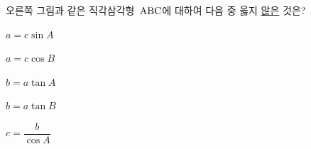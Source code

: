 \noindent\begin{minipage}[t]{0.58\linewidth}\vspace{0pt}\raggedright 오른쪽 그림과 같은 직각삼각형~$\mathrm{ABC}$에 대하여 다음 중 옳지 \underline{않은} 것은?\end{minipage}\hfill\begin{minipage}[t]{0.4\linewidth}\vspace{0pt}\centering \resizebox{\ifdim\width>\linewidth\linewidth\else\width\fi}{!}{}\end{minipage}\par
\begin{choicesii}{\rule[-3ex]{0pt}{8ex}$a=c\sin A$}{\rule[-3ex]{0pt}{8ex}$a=c\cos B$}{\rule[-3ex]{0pt}{8ex}$b=a\tan A$}{\rule[-3ex]{0pt}{8ex}$b=a\tan B$}{\rule[-3ex]{0pt}{8ex}$c=\dfrac{b}{\cos A}$}\end{choicesii}
